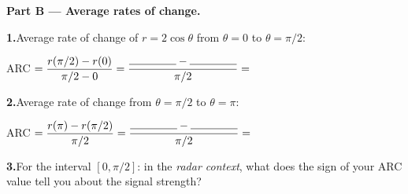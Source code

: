 \documentclass[10pt]{article}
\begin{document}
\begin{tcolorbox}[colback=white, colframe=black!40,
    title=\textbf{Tier R --- Reinforce},
    fonttitle=\bfseries, arc=2mm, left=3mm, right=3mm, top=2mm, bottom=2mm]
\vspace{8pt}
\textbf{Part B --- Average rates of change.}

\vspace{6pt}
\textbf{1.}\quad Average rate of change of $r = 2\cos\theta$ from $\theta = 0$ to $\theta = \pi/2$:

\vspace{4pt}
ARC $= \dfrac{r(\pi/2) - r(0)}{\pi/2 - 0} = \dfrac{\rule{1.5cm}{0.4pt} - \rule{1.5cm}{0.4pt}}{\pi/2} = $ \underline{\hspace{3cm}}

\vspace{8pt}
\textbf{2.}\quad Average rate of change from $\theta = \pi/2$ to $\theta = \pi$:

\vspace{4pt}
ARC $= \dfrac{r(\pi) - r(\pi/2)}{\pi/2} = \dfrac{\rule{1.5cm}{0.4pt} - \rule{1.5cm}{0.4pt}}{\pi/2} = $ \underline{\hspace{3cm}}

\vspace{8pt}
\textbf{3.}\quad For the interval $[0, \pi/2]$: in the \textit{radar context}, what does the
sign of your ARC value tell you about the signal strength?


\end{tcolorbox}

\vspace{0.08in}
\end{document}
